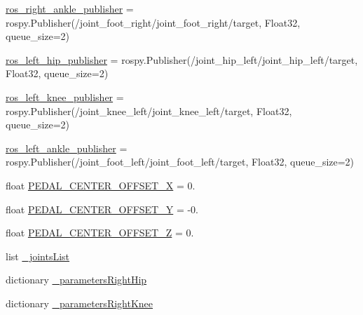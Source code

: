 \begin{DoxyCompactItemize}
\item 
\mbox{\hyperlink{namespacepedal__simulation__interpolation__lennard_a4a0183a7877199982e236ccea14e6853}{ros\+\_\+right\+\_\+ankle\+\_\+publisher}} = rospy.\+Publisher(\textquotesingle{}/joint\+\_\+foot\+\_\+right/joint\+\_\+foot\+\_\+right/target\textquotesingle{}, Float32, queue\+\_\+size=2)
\item 
\mbox{\hyperlink{namespacepedal__simulation__interpolation__lennard_a3b95457dc011945469fc488ba432e754}{ros\+\_\+left\+\_\+hip\+\_\+publisher}} = rospy.\+Publisher(\textquotesingle{}/joint\+\_\+hip\+\_\+left/joint\+\_\+hip\+\_\+left/target\textquotesingle{}, Float32, queue\+\_\+size=2)
\item 
\mbox{\hyperlink{namespacepedal__simulation__interpolation__lennard_a438877c23b8077f4602d83a386bf43f6}{ros\+\_\+left\+\_\+knee\+\_\+publisher}} = rospy.\+Publisher(\textquotesingle{}/joint\+\_\+knee\+\_\+left/joint\+\_\+knee\+\_\+left/target\textquotesingle{}, Float32, queue\+\_\+size=2)
\item 
\mbox{\hyperlink{namespacepedal__simulation__interpolation__lennard_a2815e9f74bc95113d8d6ed126914907c}{ros\+\_\+left\+\_\+ankle\+\_\+publisher}} = rospy.\+Publisher(\textquotesingle{}/joint\+\_\+foot\+\_\+left/joint\+\_\+foot\+\_\+left/target\textquotesingle{}, Float32, queue\+\_\+size=2)
\item 
float \mbox{\hyperlink{namespacepedal__simulation__interpolation__lennard_a5ce39eac5bbbdea0c44fb87736773505}{P\+E\+D\+A\+L\+\_\+\+C\+E\+N\+T\+E\+R\+\_\+\+O\+F\+F\+S\+E\+T\+\_\+X}} = 0.
\item 
float \mbox{\hyperlink{namespacepedal__simulation__interpolation__lennard_abc781674212251b058c2642319d0f8a7}{P\+E\+D\+A\+L\+\_\+\+C\+E\+N\+T\+E\+R\+\_\+\+O\+F\+F\+S\+E\+T\+\_\+Y}} = -\/0.
\item 
float \mbox{\hyperlink{namespacepedal__simulation__interpolation__lennard_a28d20a333c9810cf25891dca9f2e5f5e}{P\+E\+D\+A\+L\+\_\+\+C\+E\+N\+T\+E\+R\+\_\+\+O\+F\+F\+S\+E\+T\+\_\+Z}} = 0.
\item 
list \mbox{\hyperlink{namespacepedal__simulation__interpolation__lennard_a7217d20d124583dc667028f31053ad34}{\+\_\+joints\+List}}
\item 
dictionary \mbox{\hyperlink{namespacepedal__simulation__interpolation__lennard_aae15ab504edd4e2899f493cbc45dd161}{\+\_\+parameters\+Right\+Hip}}
\item 
dictionary \mbox{\hyperlink{namespacepedal__simulation__interpolation__lennard_a3281312a5206f0903adec5cde2a2dcd4}{\+\_\+parameters\+Right\+Knee}}

\end{DoxyCompactItemize}
